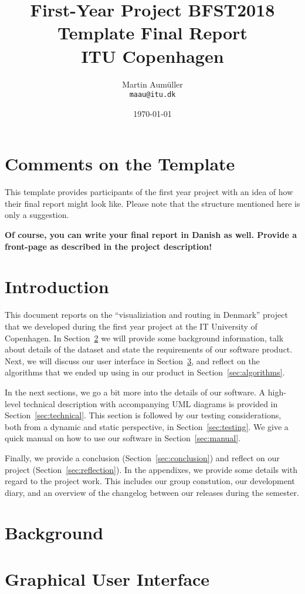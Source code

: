 \documentclass[11pt]{article}
\title{First-Year Project BFST2018\\Template Final Report\\ITU Copenhagen}
\author{Martin Aumüller\\\tt{maau@itu.dk}}
\date{\today}
\begin{document}
\maketitle

\section*{Comments on the Template} 
This template provides participants of the first year project with 
an idea of how their final report might look like. Please note that the structure 
mentioned here is only a suggestion. 

\textbf{Of course, you can write your final report in Danish as well. Provide a front-page as described in the project description!}

\section{Introduction} This document reports on the
``visualiziation and routing in Denmark'' project that we developed during the first year project at the IT University of Copenhagen.
In Section~\ref{sec:background} we will provide some background information, talk about details of the dataset and state the requirements of our software product. Next, we will discuss our user interface in Section~\ref{sec:ui}, and reflect on the algorithms that we ended up using in our product in Section~\ref{sec:algorithms}.

In the next sections, we go a bit more into the details of our software. A high-level technical description with accompanying UML diagrams is provided in Section~\ref{sec:technical}. This section is followed by our testing considerations, both from a dynamic and static perspective, in Section~\ref{sec:testing}. We give a quick manual on how to use our software in Section~\ref{sec:manual}.  

Finally, we provide a conclusion (Section~\ref{sec:conclusion}) and reflect on our project (Section~\ref{sec:reflection}). In the appendixes, we provide some details with regard to the project work. This includes our group constution, our development diary, and an overview of the changelog between our releases during the semester. 

\section{Background}\label{sec:background}

\section{Graphical User Interface}\label{sec:ui}
\end{document}
